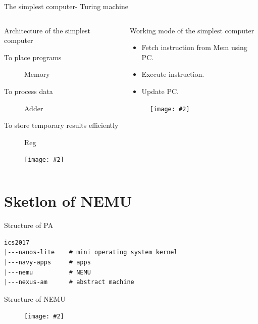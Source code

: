 \documentclass{beamer}
\title{\titletext}
\subtitle{PA1-1}
\author{Xie}
\institute{xiemhemail@gmail.com}
\date{Sep 8th, 2017}
\newcommand{\fignocaption}[2]{
	\begin{figure}[htp]
		\centering
		\texttt{[image: \#2]}
	\end{figure}
}
\begin{document}
	\maketitle

\begin{frame}{The simplest computer- Turing machine}
	\begin{columns}
		\begin{column}{0.5\textwidth}
			\begin{block}{Architecture of the simplest computer }
				\begin{description}
					\item[To place programs] Memory
					\item[To process data]Adder
					\item[To store temporary results efficiently]Reg
				\end{description}
			\end{block}
			\fignocaption{scale=0.4}{trm.png}
			
		\end{column}
		\begin{column}{0.5\textwidth}
			\begin{block}{Working mode of the simplest computer}
				\begin{itemize}
					\item Fetch instruction from Mem using PC.
					\item Execute instruction.
					\item Update PC.
				\end{itemize}
			\end{block}
			\fignocaption{scale=0.5}{tapemachine.jpg}
		\end{column}
	\end{columns}
\end{frame}

\section{Sketlon of NEMU}
\begin{frame}[fragile]{Structure of PA}
\begin{verbatim}
ics2017
|---nanos-lite    # mini operating system kernel
|---navy-apps     # apps
|---nemu          # NEMU
|---nexus-am      # abstract machine
\end{verbatim}
\end{frame}

\begin{frame}{Structure of NEMU}
\fignocaption{scale=0.3}{structureOfNEMU.png}
\end{frame}
\end{document}
